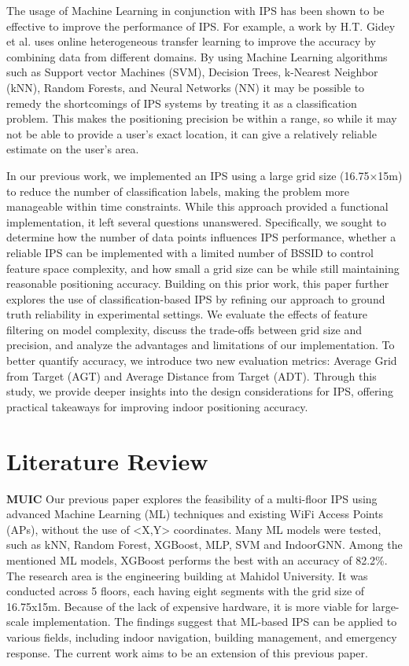 \documentclass[conference]{IEEEtran}
\begin{document}
	The usage of Machine Learning in conjunction with IPS has been shown to be effective to improve the performance of IPS. For example, a work by H.T. Gidey et al. \cite{bgp3} uses online heterogeneous transfer learning to improve the accuracy by combining data from different domains. By using Machine Learning algorithms such as Support vector Machines (SVM), Decision Trees, k-Nearest Neighbor (kNN), Random Forests, and Neural Networks (NN) it may be possible to remedy the shortcomings of IPS systems by treating it as a classification problem. This makes the positioning precision be within a range, so while it may not be able to provide a user's exact location, it can give a relatively reliable estimate on the user's area.
	
	In our previous work, we implemented an IPS using a large grid size (16.75×15m) to reduce the number of classification labels, making the problem more manageable within time constraints. While this approach provided a functional implementation, it left several questions unanswered. Specifically, we sought to determine how the number of data points influences IPS performance, whether a reliable IPS can be implemented with a limited number of BSSID to control feature space complexity, and how small a grid size can be while still maintaining reasonable positioning accuracy.
	Building on this prior work, this paper further explores the use of classification-based IPS by refining our approach to ground truth reliability in experimental settings. We evaluate the effects of feature filtering on model complexity, discuss the trade-offs between grid size and precision, and analyze the advantages and limitations of our implementation. To better quantify accuracy, we introduce two new evaluation metrics: Average Grid from Target (AGT) and Average Distance from Target (ADT). Through this study, we provide deeper insights into the design considerations for IPS, offering practical takeaways for improving indoor positioning accuracy.
	
	
	\section{Literature Review}
	\textbf{MUIC}
	Our previous paper explores the feasibility of a multi-floor IPS using advanced Machine Learning (ML) techniques and existing WiFi Access Points (APs), without the use of <X,Y> coordinates. Many ML models were tested, such as kNN, Random Forest, XGBoost, MLP, SVM and IndoorGNN. Among the mentioned ML models, XGBoost performs the best with an accuracy of 82.2\%. The research area is the engineering building at Mahidol University. It was conducted across 5 floors, each having eight segments with the grid size of 16.75x15m. Because of the lack of expensive hardware, it is more viable for large-scale implementation. The findings suggest that ML-based IPS can be applied to various fields, including indoor navigation, building management, and emergency response. The current work aims to be an extension of this previous paper.
	
\end{document}
